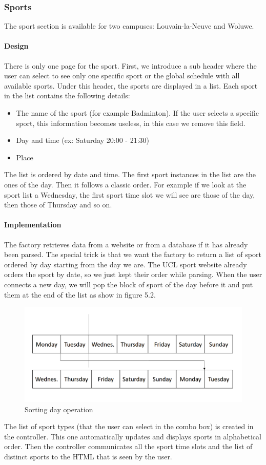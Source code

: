 \documentclass{eplmastersthesis}
\begin{document}
\newpage

\subsubsection{Sports}
The sport section is available for two campuses: Louvain-la-Neuve and Woluwe. 
\paragraph{Design}
There is only one page for the sport. First, we introduce a sub header where the user can select to see only one specific sport or the global schedule with all available sports. Under this header, the sports are displayed in a list. Each sport in the list contains the following details:
\begin{itemize}
\item The name of the sport (for example Badminton). If the user selects a specific sport, this information becomes useless, in this case we remove this field.
\item Day and time (ex: Saturday 20:00 - 21:30)
\item Place 
\end{itemize}
The list is ordered by date and time. The first sport instances in the list are the ones of the day. Then it follows a classic order. For example if we look at the sport list a Wednesday, the first sport time slot we will see are those of the day, then those of Thursday and so on. 
\paragraph{Implementation}
The factory retrieves data from a website or from a database if it has already been parsed. The special trick is that we want the factory to return a list of sport ordered by day starting from the day we are. The UCL sport website already orders the sport by date, so we just kept their order while parsing. When the user connects a new day, we will pop the block of sport of the day before it and put them at the end of the list as show in figure 5.2.
\begin{figure}[H]
\centering
\includegraphics[scale = 0.3]{Images/sportsorting.png}
\caption{Sorting day operation}
\end{figure}
The list of sport types (that the user can select in the combo box) is created in the controller. This one automatically updates and displays sports in alphabetical order. Then the controller communicates all the sport time slots and the list of distinct sports to the HTML that is seen by the user. 
\end{document}

